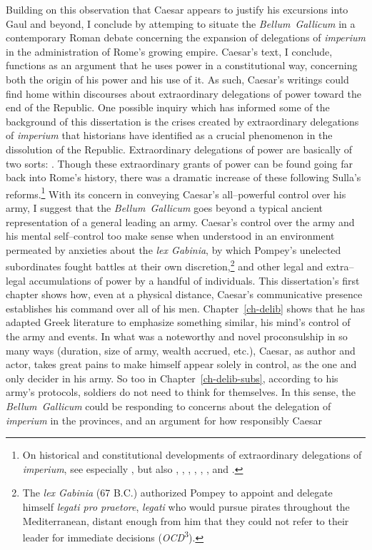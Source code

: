 \documentclass[12pt,letterpaper,oneside,final]{memoir}
\begin{document}
Building on this observation that Caesar appears to justify his excursions into Gaul and beyond, I conclude by attemping to situate the \emph{Bellum~Gallicum} in a contemporary Roman debate concerning the expansion of delegations of \emph{imperium} in the administration of Rome's growing empire. Caesar's text, I conclude, functions as an argument that he uses power in a constitutional way, concerning both the origin of his power and his use of it. %
 As such, Caesar's writings could find home within discourses about extraordinary delegations of power toward the end of the Republic. One possible inquiry which has informed some of the background of this dissertation is the crises created by extraordinary delegations of \emph{imperium} that historians have identified as a crucial phenomenon in the dissolution of the Republic. Extraordinary delegations of power are basically of two sorts: . Though these extraordinary grants of power can be found going far back into Rome's history, there was a dramatic increase of these following Sulla's reforms.\footnote{On historical and constitutional developments of extraordinary delegations of \emph{imperium}, see especially \textcite[esp.~pp.~634--637, also 557--570, 630--639]{brennan2000}, but also \textcite[II: 1.647--662]{mommsen1887}, \textcite{ehrenberg1953}, \textcite[534--543]{gruen1974}, \textcite[59]{lintott1981}, \textcite[281, 290--292]{ridley1981}, \textcite{richardson1991}, and \textcite[114--115]{lintott1999}.} With its concern in conveying Caesar's all--powerful control over his army, I suggest that the \emph{Bellum~Gallicum} goes beyond a typical ancient representation of a general leading an army. Caesar's control over the army and his mental self--control too make sense when understood in an environment permeated by anxieties about the \emph{lex Gabinia}, by which Pompey's unelected subordinates fought battles at their own discretion,\footnote{The \emph{lex Gabinia} (67 B.C.) authorized Pompey to appoint and delegate himself \emph{legati pro praetore}, \emph{legati} who would pursue pirates throughout the Mediterranean, distant enough from him that they could not refer to their leader for immediate decisions (\emph{OCD}\textsuperscript{3}).} and other legal and extra--legal accumulations of power by a handful of individuals. This dissertation's first chapter shows how, even at a physical distance, Caesar's communicative presence establishes his command over all of his men. Chapter~\ref{ch-delib} shows that he has adapted Greek literature to emphasize something similar, his mind's control of the army and events. In what was a noteworthy and novel proconsulship in so many ways (duration, size of army, wealth accrued, etc.), Caesar, as author and actor, takes great pains to make himself appear solely in control, as the one and only decider in his army. So too in Chapter~\ref{ch-delib-subs}, according to his army's protocols, soldiers do not need to think for themselves. In this sense, the \emph{Bellum~Gallicum} could be responding to concerns about the delegation of \emph{imperium} in the provinces, and an argument for how responsibly Caesar 
\end{document}
